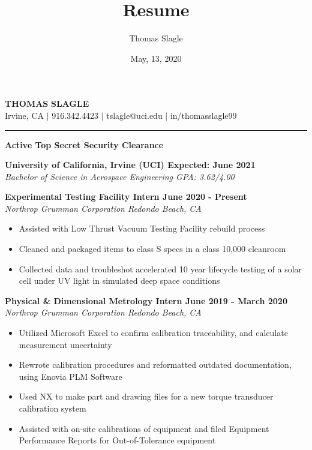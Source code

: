 \documentclass[10pt]{article}
\newcommand{\doublerule}[1][.4pt]{%
  \noindent
  \makebox[0pt][l]{\rule[.7ex]{\linewidth}{#1}}%
  \rule[.3ex]{\linewidth}{#1}}
\begin{document}
\title{Resume}
\author{Thomas Slagle}
\date{May, 13, 2020}

\thispagestyle{empty}
\pagestyle{empty}


\begin{center}
    {\LARGE\textbf{T}\Large\textbf{HOMAS} \LARGE\textbf{S}\Large\textbf{LAGLE}} \\
    Irvine, CA $\mid$ 916.342.4423 $\mid$ tslagle@uci.edu $\mid$ in/thomasslagle99
    \doublerule[1pt]
\end{center}

\begin{center}
    \noindent\textbf{Active Top Secret Security Clearance}\\
\end{center}


\vspace{0.001in}

\myrule

\noindent\textbf{University of California, Irvine (UCI) \hfill Expected: June 2021}\\
\textit{Bachelor of Science in Aerospace Engineering \hfill GPA: 3.62/4.00}

\vspace{0.15in}

\myrule
\noindent\textbf{Experimental Testing Facility Intern \hfill June 2020 - Present}\\
\textit{Northrop Grumman Corporation \hfill Redondo Beach, CA}
\begin{itemize}
    \item Assisted with Low Thrust Vacuum Testing Facility rebuild process
    \item Cleaned and packaged items to class S specs in a class 10,000 cleanroom
    \item Collected data and troubleshot accelerated 10 year lifecycle testing of a solar cell under UV light in simulated deep space conditions
\end{itemize}

\vspace{0.08in}

\noindent\textbf{Physical \& Dimensional Metrology Intern \hfill June 2019 - March 2020}\\
\textit{Northrop Grumman Corporation \hfill Redondo Beach, CA}
\begin{itemize}
    \item Utilized Microsoft Excel to confirm calibration traceability, and calculate measurement uncertainty
    \item Rewrote calibration procedures and reformatted outdated documentation, using Enovia PLM Software
    \item Used NX to make part and drawing files for a new torque transducer calibration system
    \item Assisted with on-site calibrations of equipment and filed Equipment Performance Reports for Out-of-Tolerance equipment

\end{itemize}
\end{document}
